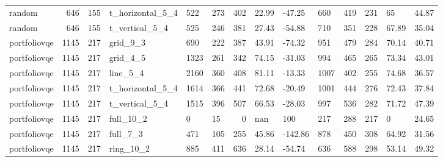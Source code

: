 \begin{longtable}{lrrlllrllllrll}
random & 646 & 155 & t\_horizontal\_5\_4 & 522 & 273 & 402 & 22.99 & -47.25 & 660 & 419 & 231 & 65 & 44.87 \\
random & 646 & 155 & t\_vertical\_5\_4 & 525 & 246 & 381 & 27.43 & -54.88 & 710 & 351 & 228 & 67.89 & 35.04 \\
portfoliovqe & 1145 & 217 & grid\_9\_3 & 690 & 222 & 387 & 43.91 & -74.32 & 951 & 479 & 284 & 70.14 & 40.71 \\
portfoliovqe & 1145 & 217 & grid\_4\_5 & 1323 & 261 & 342 & 74.15 & -31.03 & 994 & 465 & 265 & 73.34 & 43.01 \\
portfoliovqe & 1145 & 217 & line\_5\_4 & 2160 & 360 & 408 & 81.11 & -13.33 & 1007 & 402 & 255 & 74.68 & 36.57 \\
portfoliovqe & 1145 & 217 & t\_horizontal\_5\_4 & 1614 & 366 & 441 & 72.68 & -20.49 & 1001 & 444 & 276 & 72.43 & 37.84 \\
portfoliovqe & 1145 & 217 & t\_vertical\_5\_4 & 1515 & 396 & 507 & 66.53 & -28.03 & 997 & 536 & 282 & 71.72 & 47.39 \\
portfoliovqe & 1145 & 217 & full\_10\_2 & 0 & 15 & 0 & nan & 100 & 217 & 288 & 217 & 0 & 24.65 \\
portfoliovqe & 1145 & 217 & full\_7\_3 & 471 & 105 & 255 & 45.86 & -142.86 & 878 & 450 & 308 & 64.92 & 31.56 \\
portfoliovqe & 1145 & 217 & ring\_10\_2 & 885 & 411 & 636 & 28.14 & -54.74 & 636 & 588 & 298 & 53.14 & 49.32 \\
\end{longtable}
